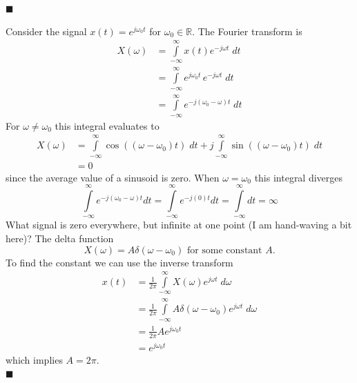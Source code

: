 \begin{example}
\begin{center}
  \end{center}
  $\blacksquare$
\end{example}
\begin{example}
Consider the signal $x(t) = e^{j\omega_0 t}$ for $\omega_0\in \mathbb{R}$.  The Fourier transform is
  \begin{align*}
    X(\omega) &= \int\limits_{-\infty}^{\infty} x(t) e^{-j\omega t}\; dt\\
    &= \int\limits_{-\infty}^{\infty}  e^{j\omega_0 t} \, e^{-j\omega t}\; dt\\
    &= \int\limits_{-\infty}^{\infty}  e^{-j(\omega_0-\omega) t}\; dt
  \end{align*}
  For $\omega \neq \omega_0$ this integral evaluates to
  \begin{align*}
    X(\omega) &= \int\limits_{-\infty}^{\infty}  \cos((\omega-\omega_0) t)\; dt + j \int\limits_{-\infty}^{\infty}  \sin((\omega-\omega_0) t)\; dt\\
    &= 0
  \end{align*}
  since the average value of a sinusoid is zero. When $\omega = \omega_0$ this integral diverges
  \[
  \int\limits_{-\infty}^{\infty}  e^{-j(\omega_0-\omega) t}dt = \int\limits_{-\infty}^{\infty}  e^{-j(0) t} dt= \int\limits_{-\infty}^{\infty} dt = \infty 
  \]
  What signal is zero everywhere, but infinite at one point (I am hand-waving a bit here)? The delta function
  \[
  X(\omega) = A\delta(\omega-\omega_0) \mbox{ for some constant } A.
  \]
  To find the constant we can use the inverse transform
  \begin{align*}
    x(t) &= \frac{1}{2\pi} \int\limits_{-\infty}^{\infty} X(\omega)e^{j\omega t}\; d\omega\\
    &= \frac{1}{2\pi} \int\limits_{-\infty}^{\infty}  A\delta(\omega-\omega_0) e^{j\omega t}\; d\omega\\
    &= \frac{1}{2\pi} A e^{j\omega_0 t}\\
    &= e^{j\omega_0 t}
  \end{align*}
  which implies $A = 2\pi$.\\
  $\blacksquare$
\end{example}


